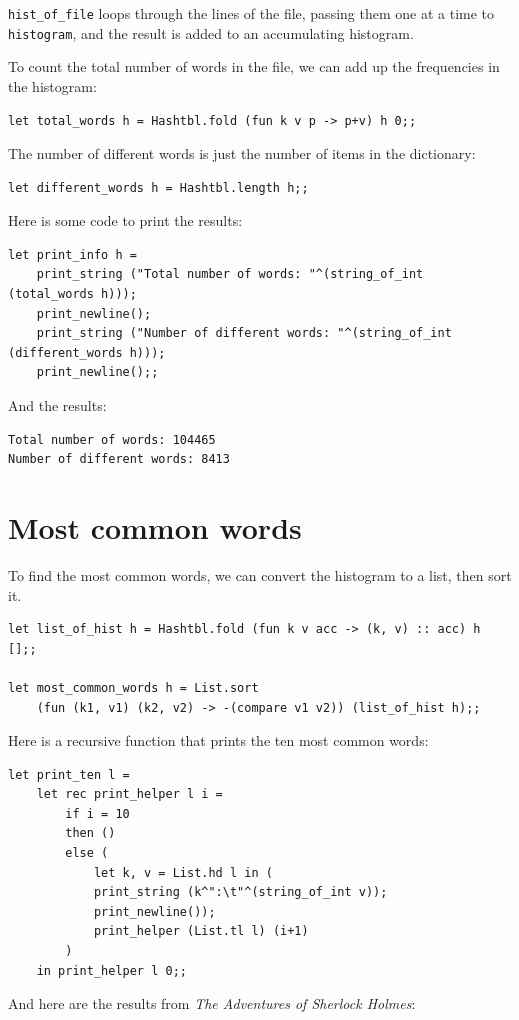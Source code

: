 \documentclass[10pt]{book}
\begin{document}

\verb"hist_of_file" loops through the lines of the file, passing them one at a time to \verb"histogram", and the result is added to an accumulating histogram.


To count the total number of words in the file, we can add up
the frequencies in the histogram:

\beforeverb
\begin{verbatim}
let total_words h = Hashtbl.fold (fun k v p -> p+v) h 0;;
\end{verbatim}
\afterverb
%
The number of different words is just the number of items in
the dictionary:

\beforeverb
\begin{verbatim}
let different_words h = Hashtbl.length h;;
\end{verbatim}
\afterverb
%
Here is some code to print the results:

\beforeverb
\begin{verbatim}
let print_info h = 
	print_string ("Total number of words: "^(string_of_int (total_words h)));
	print_newline();
	print_string ("Number of different words: "^(string_of_int (different_words h)));
	print_newline();;
\end{verbatim}
\afterverb
%
And the results:

\beforeverb
\begin{verbatim}
Total number of words: 104465
Number of different words: 8413
\end{verbatim}
\afterverb
%

\section{Most common words}

To find the most common words, we can convert the histogram to a list, then sort it.

\beforeverb
\begin{verbatim}
let list_of_hist h = Hashtbl.fold (fun k v acc -> (k, v) :: acc) h [];;

let most_common_words h = List.sort
	(fun (k1, v1) (k2, v2) -> -(compare v1 v2)) (list_of_hist h);;\end{verbatim}
\afterverb
%
Here is a recursive function that prints the ten most common words:

\beforeverb
\begin{verbatim}
let print_ten l = 
	let rec print_helper l i = 
		if i = 10
		then ()
		else (
			let k, v = List.hd l in (
			print_string (k^":\t"^(string_of_int v));
			print_newline());
			print_helper (List.tl l) (i+1)
		)
	in print_helper l 0;;
\end{verbatim}
\afterverb
%
And here are the results from {\em The Adventures of Sherlock Holmes}:
\end{document}
